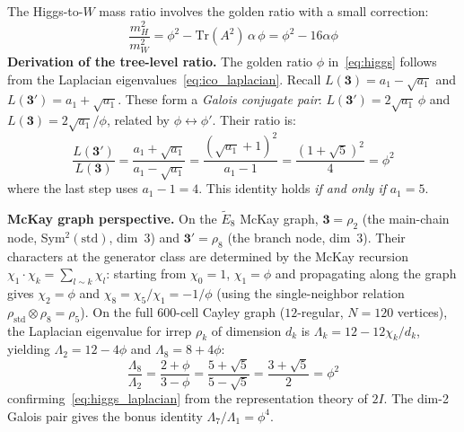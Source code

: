 \documentclass[12pt,a4paper]{article}
\theoremstyle{definition}
\begin{document}
The Higgs-to-$W$ mass ratio involves the golden ratio with a small correction:
\begin{equation}
\boxed{\frac{m_H^2}{m_W^2} = \phi^2 - \mathrm{Tr}(A^2)\,\alpha\,\phi = \phi^2 - 16\alpha\phi}
\label{eq:higgs}
\end{equation}
\textbf{Derivation of the tree-level ratio.}  The golden ratio $\phi$ in~\eqref{eq:higgs} follows from the Laplacian eigenvalues~\eqref{eq:ico_laplacian}.  Recall $L(\mathbf{3}) = a_1 - \sqrt{a_1}$ and $L(\mathbf{3'}) = a_1 + \sqrt{a_1}$.  These form a \emph{Galois conjugate pair}: $L(\mathbf{3'}) = 2\sqrt{a_1}\,\phi$ and $L(\mathbf{3}) = 2\sqrt{a_1}/\phi$, related by $\phi \leftrightarrow \phi'$.  Their ratio is:
\begin{equation}
\frac{L(\mathbf{3'})}{L(\mathbf{3})} = \frac{a_1 + \sqrt{a_1}}{a_1 - \sqrt{a_1}} = \frac{(\sqrt{a_1}+1)^2}{a_1 - 1} = \frac{(1+\sqrt{5})^2}{4} = \phi^2
\label{eq:higgs_laplacian}
\end{equation}
where the last step uses $a_1 - 1 = 4$.  This identity holds \emph{if and only if} $a_1 = 5$.

\textbf{McKay graph perspective.}  On the $\widetilde{E}_8$ McKay graph, $\mathbf{3} = \rho_2$ (the main-chain node, Sym$^2(\text{std})$, dim~3) and $\mathbf{3'} = \rho_8$ (the branch node, dim~3).  Their characters at the generator class are determined by the McKay recursion $\chi_1 \cdot \chi_k = \sum_{l \sim k} \chi_l$: starting from $\chi_0 = 1$, $\chi_1 = \phi$ and propagating along the graph gives $\chi_2 = \phi$ and $\chi_8 = \chi_5/\chi_1 = -1/\phi$ (using the single-neighbor relation $\rho_{\mathrm{std}} \otimes \rho_8 = \rho_5$).  On the full 600-cell Cayley graph ($12$-regular, $N=120$ vertices), the Laplacian eigenvalue for irrep $\rho_k$ of dimension $d_k$ is $\Lambda_k = 12 - 12\chi_k/d_k$, yielding $\Lambda_2 = 12 - 4\phi$ and $\Lambda_8 = 8 + 4\phi$:
\begin{equation}
\frac{\Lambda_8}{\Lambda_2} = \frac{2+\phi}{3-\phi} = \frac{5+\sqrt{5}}{5-\sqrt{5}} = \frac{3+\sqrt{5}}{2} = \phi^2
\label{eq:higgs_mckay}
\end{equation}
confirming~\eqref{eq:higgs_laplacian} from the representation theory of $2I$.  The dim-2 Galois pair gives the bonus identity $\Lambda_7/\Lambda_1 = \phi^4$.
\end{document}
